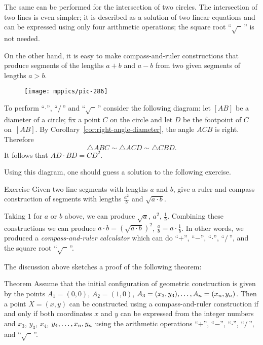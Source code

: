 The same can be performed for the intersection of two circles. 
The intersection of two lines is even simpler; 
it is described as a solution of two linear equations and can be expressed using only four arithmetic operations;
the square root ``$\sqrt{\phantom{a}}\,$'' is not needed.

\medskip

On the other hand, it is easy to make compass-and-ruler constructions that produce segments of the lengths $a+b$ and $a-b$ from two given segments of lengths $a>b$.

\begin{wrapfigure}{r}{37mm}
\vskip-6mm
\centering
\texttt{[image: mppics/pic-286]}
\end{wrapfigure}

To perform ``$\cdot$'', ``$/\,$''
and ``$\sqrt{\phantom{a}}\,$'' consider the following diagram:
let $[AB]$ be a diameter of a circle; 
fix a point $C$ on the circle and let $D$ be the footpoint of $C$ on~$[AB]$.
By Corollary~\ref{cor:right-angle-diameter}, the angle $ACB$ is right.
Therefore 
$$\triangle ABC\sim\triangle ACD\sim \triangle CBD.$$
It follows that $AD\cdot BD=CD^2$. 

Using this diagram, one should guess a solution to the following exercise.

\begin{thm}{Exercise}\label{ex:a2/b}
Given two line segments with lengths $a$ and $b$, give a ruler-and-compass construction of segments with lengths $\tfrac {a^2}b$ and $\sqrt{a\cdot b}$.
\end{thm}


Taking $1$ for $a$ or $b$ above, we can produce 
$\sqrt a$, $a^2$, $\tfrac1b$.
Combining these constructions we can produce
$a\cdot b=(\sqrt{a\cdot b})^2$,
$\tfrac ab=a\cdot\tfrac 1b$.
In other words, we produced a \emph{compass-and-ruler calculator} which can do ``$+$'', ``$-$'', ``$\cdot$'', ``$/\,$'', and the square root ``$\sqrt{\phantom{a}}\,$''.

The discussion above sketches a proof of the following theorem:
 
\begin{thm}{Theorem}\label{thm:constructible-numbers}
Assume that the initial configuration of geometric construction is given by the points $A_1=(0,0)$, $A_2=(1,0)$, $A_3\z=(x_3,y_3),\z\dots,A_n=(x_n,y_n)$.
Then a point $X=(x,y)$ can be constructed using a compass-and-ruler construction
if and only if both coordinates $x$ and $y$ can be expressed from the integer numbers and $x_3$, $y_3$, $x_4$, $y_4,\z\dots,x_n,y_n$ using the arithmetic operations ``$+$'', ``$-$'', ``$\cdot$'', ``$/\,$'', and ``$\sqrt{\phantom{a}}\,$''.
\end{thm}

